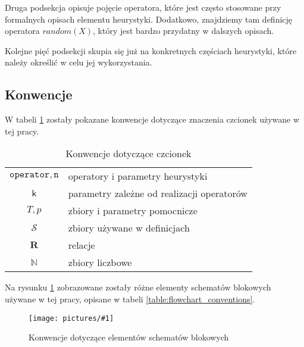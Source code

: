 \documentclass[twoside]{iisthesis}
\newcommand{\numberSet}[1]{\mathbb{#1}}
\newcommand{\important}[1]{\mathcal{#1}}
\newcommand{\R}{\mathbf{R}}
\newcommand{\param}[1]{\mathtt{#1}}
\newcommand{\variable}[1]{\mathsf{#1}}
\newcommand{\img}[1]{\centering \texttt{[image: pictures/\#1]}}
\begin{document}
Druga podsekcja opisuje pojęcie operatora, które jest często stosowane przy formalnych opisach elementu heurystyki. Dodatkowo, znajdziemy tam definicję operatora $random(X)$, który jest bardzo przydatny w dalszych opisach.

Kolejne pięć podsekcji skupia się już na konkretnych częściach heurystyki, które należy określić w celu jej wykorzystania.

\subsection{Konwencje} \label{subsection:conventions}

W tabeli \ref{table:signature_conventions} zostały pokazane konwencje dotyczące znaczenia czcionek używane w tej pracy.

\begin{table}[b]
	\caption{Konwencje dotyczące czcionek \label{table:signature_conventions}}
	\centering
	\begin{tabular}{cl}
		$\param{operator}, \param{n}$ & operatory i parametry heurystyki \\
		$\variable{k}$ & parametry zależne od realizacji operatorów \\
		$T, p$ & zbiory i parametry pomocnicze \\
		$\important{S}$ & zbiory używane w definicjach \\
		$\R$ & relacje \\
		$\numberSet{N}$ & zbiory liczbowe
	\end{tabular}
\end{table}

Na rysunku \ref{figure:flowchart_conventions} zobrazowane zostały różne elementy schematów blokowych używane w tej pracy, opisane w tabeli \ref{table:flowchart_conventions}.

\begin{figure}
	\caption{Konwencje dotyczące elementów schematów blokowych \label{figure:flowchart_conventions}}
	\img{conventions.png}
\end{figure}
\end{document}
